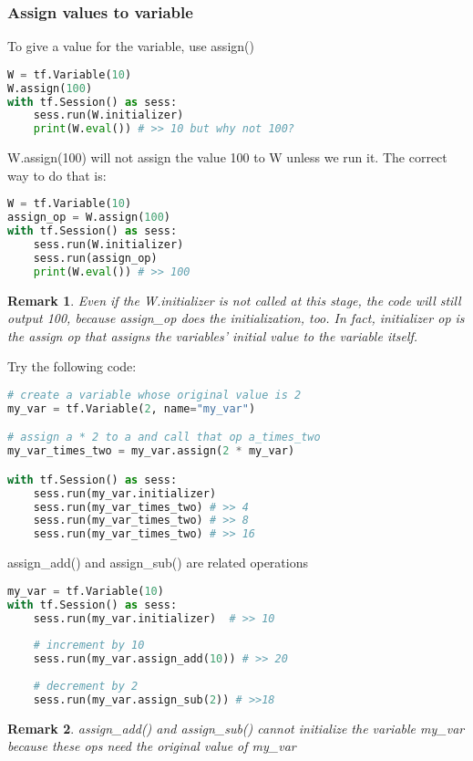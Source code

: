 \documentclass{article}
\newtheorem*{remark}{Remark}
\begin{document}
	\subsubsection{Assign values to variable}
	To give a value for the variable, use assign()
\begin{lstlisting}[language=Python,morekeywords ={as}]
W = tf.Variable(10)
W.assign(100)
with tf.Session() as sess:
	sess.run(W.initializer)
	print(W.eval()) # >> 10 but why not 100?
\end{lstlisting}
	W.assign(100) will not assign the value 100 to W unless we run it. The correct way to do that is:
	\begin{lstlisting}[language=Python,morekeywords ={as}]
W = tf.Variable(10)
assign_op = W.assign(100)
with tf.Session() as sess:
	sess.run(W.initializer)    
	sess.run(assign_op)  
	print(W.eval()) # >> 100
\end{lstlisting}
	\begin{remark}
		Even if the W.initializer is not called at this stage, the code will still output 100, because assign\_op does the initialization, too. In fact, initializer op is the assign op that assigns the variables' initial value to the variable itself.
	\end{remark}
	Try the following code:
	\begin{lstlisting}[language=Python,morekeywords ={as}]
# create a variable whose original value is 2
my_var = tf.Variable(2, name="my_var")

# assign a * 2 to a and call that op a_times_two
my_var_times_two = my_var.assign(2 * my_var)

with tf.Session() as sess:
	sess.run(my_var.initializer)
	sess.run(my_var_times_two) # >> 4
	sess.run(my_var_times_two) # >> 8
	sess.run(my_var_times_two) # >> 16
\end{lstlisting}
	assign\_add() and assign\_sub() are related operations
	\begin{lstlisting}[language=Python,morekeywords ={as}]
my_var = tf.Variable(10)
with tf.Session() as sess:
	sess.run(my_var.initializer)  # >> 10
	
	# increment by 10
	sess.run(my_var.assign_add(10)) # >> 20
	
	# decrement by 2
	sess.run(my_var.assign_sub(2)) # >>18
\end{lstlisting}	
	\begin{remark}
	assign\_add() and assign\_sub() cannot initialize the variable my\_var because these ops need the original value of my\_var
	\end{remark}
\end{document}
